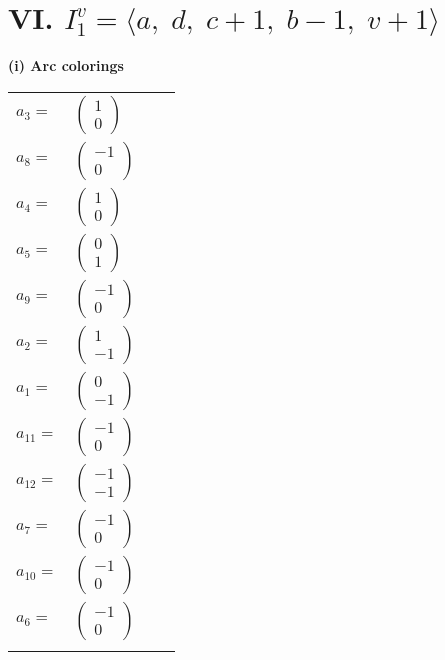 \documentclass[1p]{elsarticle_modified}
\theoremstyle{definition}
\begin{document}
\centering \section*{VI. $I^v_{1}= \langle a,\;d,\;c+1,\;b-1,\;v+1 \rangle$}
\flushleft \textbf{(i) Arc colorings}\\
\begin{tabular}{m{7pt} m{180pt} m{7pt} m{180pt} }
\flushright $a_{3}=$&$\begin{pmatrix}1\\0\end{pmatrix}$ \\
\flushright $a_{8}=$&$\begin{pmatrix}-1\\0\end{pmatrix}$ \\
\flushright $a_{4}=$&$\begin{pmatrix}1\\0\end{pmatrix}$ \\
\flushright $a_{5}=$&$\begin{pmatrix}0\\1\end{pmatrix}$ \\
\flushright $a_{9}=$&$\begin{pmatrix}-1\\0\end{pmatrix}$ \\
\flushright $a_{2}=$&$\begin{pmatrix}1\\-1\end{pmatrix}$ \\
\flushright $a_{1}=$&$\begin{pmatrix}0\\-1\end{pmatrix}$ \\
\flushright $a_{11}=$&$\begin{pmatrix}-1\\0\end{pmatrix}$ \\
\flushright $a_{12}=$&$\begin{pmatrix}-1\\-1\end{pmatrix}$ \\
\flushright $a_{7}=$&$\begin{pmatrix}-1\\0\end{pmatrix}$ \\
\flushright $a_{10}=$&$\begin{pmatrix}-1\\0\end{pmatrix}$ \\
\flushright $a_{6}=$&$\begin{pmatrix}-1\\0\end{pmatrix}$\\&\end{tabular}
\end{document}
